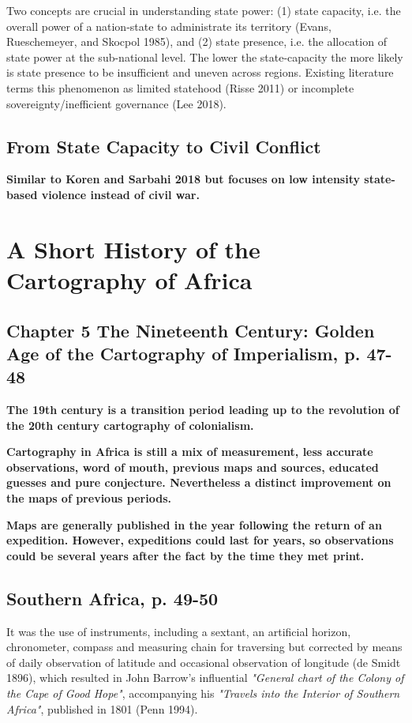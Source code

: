 \documentclass[12pt]{article}
\begin{document}
Two concepts are crucial in understanding state power: (1) state capacity, i.e.
the overall power of a nation-state to administrate its territory (Evans,
Rueschemeyer, and Skocpol 1985), and (2) state presence, i.e. the allocation of
state power at the sub-national level. The lower the state-capacity the more
likely is state presence to be insufficient and uneven across regions. Existing
literature terms this phenomenon as limited statehood (Risse 2011) or
incomplete sovereignty/inefficient governance (Lee 2018).

\subsection{From State Capacity to Civil Conflict}

\textbf{Similar to Koren and Sarbahi 2018 but focuses on low intensity state-based
violence instead of civil war.}

\section{A Short History of the Cartography of Africa \citep{Stone1995}}

\subsection{Chapter 5 The Nineteenth Century: Golden Age of the Cartography of
Imperialism, p. 47-48 }

\textbf{The 19th century is a transition period leading up to the revolution
of the 20th  century cartography of colonialism.}

\textbf{Cartography in Africa is still a mix of measurement, less accurate
observations, word of mouth,  previous maps and sources, educated guesses and
pure conjecture.  Nevertheless a distinct improvement on the maps of previous
periods.}

\textbf{Maps are generally published in the year following the return of an
expedition.  However, expeditions could last for years, so observations could be
several years after the fact by the time they met print.}

\subsection{Southern Africa, p. 49-50}

It was the use of instruments, including a sextant, an artificial horizon,
chronometer, compass and measuring chain for traversing but corrected by means
of daily observation of latitude and occasional observation of longitude (de
Smidt 1896), which resulted in John Barrow's influential 
\textit{"General chart of the Colony of the Cape of Good Hope"}, accompanying
his \textit{"Travels into the Interior of Southern Africa"}, published in 1801
(Penn 1994).
\end{document}
